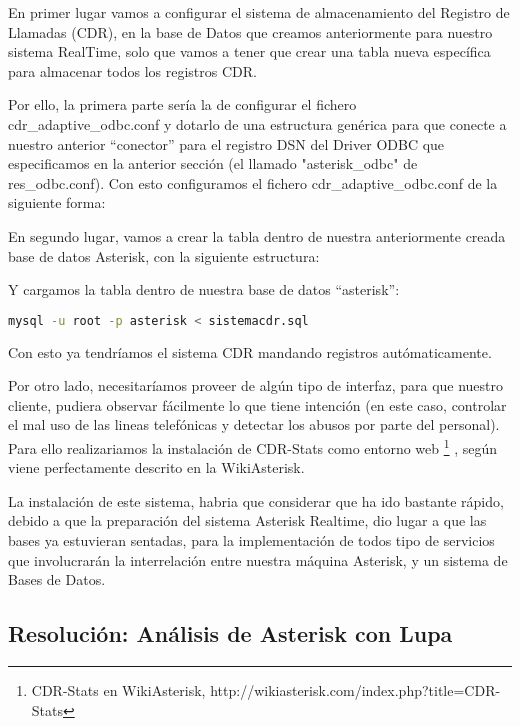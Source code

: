 En primer lugar vamos a configurar el sistema de almacenamiento del Registro de Llamadas (CDR), en la base de Datos que creamos anteriormente para nuestro sistema RealTime, solo que vamos a tener que crear una tabla nueva específica para almacenar todos los registros CDR.

Por ello, la primera parte sería la de configurar el fichero cdr\_adaptive\_odbc.conf y dotarlo de una estructura genérica para que conecte a nuestro anterior ``conector'' para el registro DSN del Driver ODBC que especificamos en la anterior sección (el llamado "asterisk\_odbc" de res\_odbc.conf). Con esto configuramos el fichero cdr\_adaptive\_odbc.conf de la siguiente forma:



En segundo lugar, vamos a crear la tabla dentro de nuestra anteriormente creada base de datos Asterisk, con la siguiente estructura:



Y cargamos la tabla dentro de nuestra base de datos ``asterisk'':

\begin{lstlisting}[language=sh]
mysql -u root -p asterisk < sistemacdr.sql
\end{lstlisting}

Con esto ya tendríamos el sistema CDR mandando registros autómaticamente.

Por otro lado, necesitaríamos proveer de algún tipo de interfaz, para que nuestro cliente, pudiera observar fácilmente lo que tiene intención (en este caso, controlar el mal uso de las lineas telefónicas y detectar los abusos por parte del personal). Para ello realizariamos la instalación de CDR-Stats como entorno web \footnote{CDR-Stats en WikiAsterisk, http://wikiasterisk.com/index.php?title=CDR-Stats} \cite{website:cdrstats}, según viene perfectamente descrito en la WikiAsterisk.

La instalación de este sistema, habria que considerar que ha ido bastante rápido, debido a que la preparación del sistema Asterisk Realtime, dio lugar a que las bases ya estuvieran sentadas, para la implementación de todos tipo de servicios que involucrarán la interrelación entre nuestra máquina Asterisk, y un sistema de Bases de Datos.

\subsection{Resolución: Análisis de Asterisk con Lupa}


